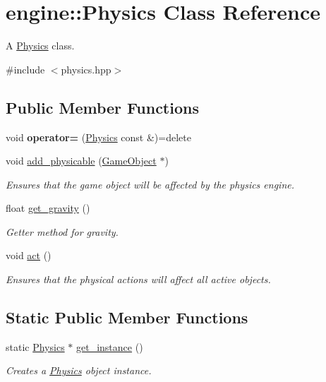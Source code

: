 \hypertarget{classengine_1_1_physics}{}\section{engine\+:\+:Physics Class Reference}
\label{classengine_1_1_physics}


A \hyperlink{classengine_1_1_physics}{Physics} class.  




{\ttfamily \#include $<$physics.\+hpp$>$}

\subsection*{Public Member Functions}
\begin{DoxyCompactItemize}
\item 
void {\bfseries operator=} (\hyperlink{classengine_1_1_physics}{Physics} const \&)=delete\hypertarget{classengine_1_1_physics_a28a67fa9177a00fa17cc94235870aac6}{}\label{classengine_1_1_physics_a28a67fa9177a00fa17cc94235870aac6}

\item 
void \hyperlink{classengine_1_1_physics_a3ea90787e9875fd848d60702b4d787b6}{add\+\_\+physicable} (\hyperlink{classengine_1_1_game_object}{Game\+Object} $\ast$)
\begin{DoxyCompactList}\small\item\em Ensures that the game object will be affected by the physics engine. \end{DoxyCompactList}\item 
float \hyperlink{classengine_1_1_physics_a0467d64aa843a48a8af5e5eccc9a4407}{get\+\_\+gravity} ()
\begin{DoxyCompactList}\small\item\em Getter method for gravity. \end{DoxyCompactList}\item 
void \hyperlink{classengine_1_1_physics_a715afb08feafa90c9e50b51977825364}{act} ()
\begin{DoxyCompactList}\small\item\em Ensures that the physical actions will affect all active objects. \end{DoxyCompactList}\end{DoxyCompactItemize}
\subsection*{Static Public Member Functions}
\begin{DoxyCompactItemize}
\item 
static \hyperlink{classengine_1_1_physics}{Physics} $\ast$ \hyperlink{classengine_1_1_physics_ade5c34703f40c9a395ae4d03b7089f27}{get\+\_\+instance} ()
\begin{DoxyCompactList}\small\item\em Creates a \hyperlink{classengine_1_1_physics}{Physics} object instance. \end{DoxyCompactList}\end{DoxyCompactItemize}


